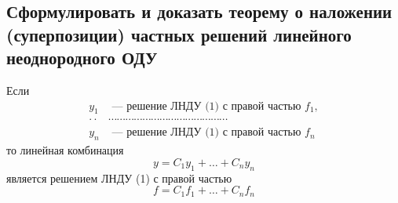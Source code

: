 \subsection{Сформулировать и доказать теорему о наложении (суперпозиции) частных решений линейного неоднородного ОДУ}

\begin{theorem*}
    Если \vspace{-\topsep}
    \begin{align*}
        y_1 &\text{ --- решение ЛНДУ (1) с правой частью } f_1, \\ 
        \cdot\cdot&\cdots\cdots\cdots\cdots\cdots\cdots\cdots\cdots\cdots\cdots\cdots\cdots\cdots\cdots \\
        y_n &\text{ --- решение ЛНДУ (1) с правой частью } f_n
    \end{align*}
    то линейная комбинация 
    \[
        y = C_1y_1 + \ldots + C_ny_n
    \]
    является решением ЛНДУ (1) с правой частью 
    \[
        f = C_1f_1 + \ldots + C_nf_n
    \]
\end{theorem*}
\newpage
